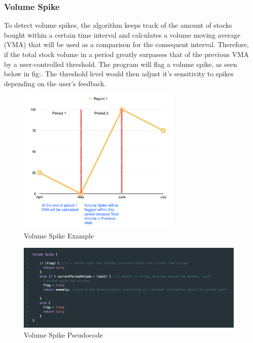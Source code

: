 \documentclass[12pt]{article}
\begin{document}
    \subsubsection{Volume Spike}
    To detect volume spikes, the algorithm keeps track of the amount of stocks bought within a certain time interval and calculates a volume moving average (VMA) that will be used as a comparison for the consequent interval. Therefore, if the total stock
    volume in a period greatly surpasses that of the previous VMA by a user-controlled threshold. The program will flag a volume spike, as seen below in fig:. The threshold level would then adjust it's sensitivity to spikes depending on the user's feedback.
    \begin{figure}[H]
    \centering
    \includegraphics[width=80mm]{VSGraph.png}
    \caption{Volume Spike Example}
    \end{figure}
    \begin{figure}[H]
    \centering
    \includegraphics[width=150mm]{VSpseudo.png}
    \caption{Volume Spike Pseudocode}
    \end{figure}
\end{document}

